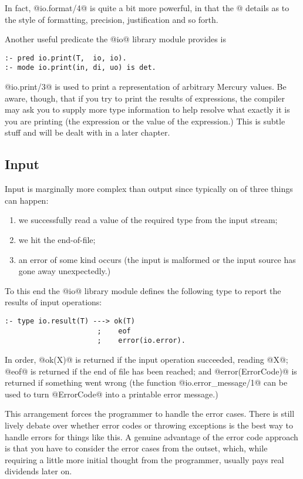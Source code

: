 In fact, @io.format/4@ is quite a bit more powerful, in
that the @%
details as to the style of formatting, precision,
justification and so forth.

Another useful predicate the @io@ library module provides is
\begin{verbatim}
:- pred io.print(T,  io, io).
:- mode io.print(in, di, uo) is det.
\end{verbatim}
@io.print/3@ is used to print a representation of arbitrary
Mercury values.  Be aware, though, that if you try to
print the results of expressions, the compiler may ask you
to supply more type information to help resolve what
exactly it is you are printing (\ie the expression or the
value of the expression.)  This is subtle stuff and will
be dealt with in a later chapter. \XXX{}

\subsection{Input}

Input is marginally more complex than output since
typically on of three things can happen:
\begin{enumerate}
\item we successfully read a value of the required type from
  the input stream;
\item we hit the end-of-file;
\item an error of some kind occurs (\eg the input is
  malformed or the input source has gone away unexpectedly.)
\end{enumerate}

To this end the @io@ library module defines the following
type to report the results of input operations:
\begin{verbatim}
:- type io.result(T) ---> ok(T)
                      ;    eof
                      ;    error(io.error).
\end{verbatim}
In order, @ok(X)@ is returned if the input operation
succeeded, reading @X@; @eof@ is returned if the end of file
has been reached; and @error(ErrorCode)@ is returned if
something went wrong (the function @io.error_message/1@ can
be used to turn @ErrorCode@ into a printable error message.)

This arrangement forces the programmer to handle the error
cases.  There is still lively debate over whether error
codes or throwing exceptions is the best way to handle
errors for things like this.  A genuine advantage of the
error code approach is that you have to consider the error
cases from the outset, which, while requiring a little
more initial thought from the programmer, usually pays
real dividends later on.

